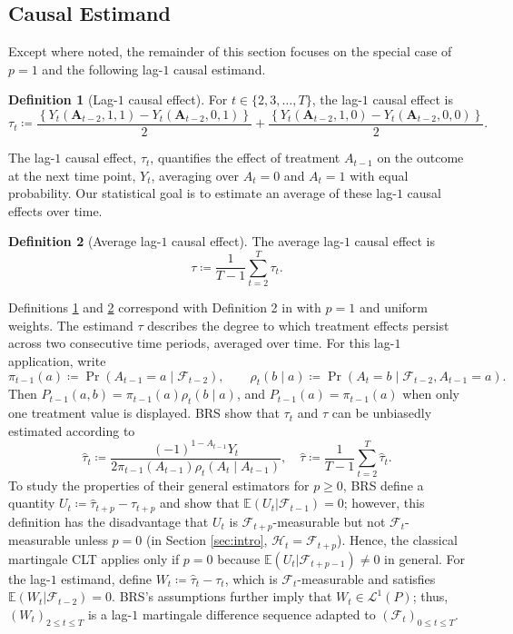 \documentclass[11pt]{article}
\renewcommand\vec[1]{\boldsymbol{#1}}
\newcommand{\E}{\mathbb{E}}
\newcommand{\Hcal}{\mathcal{H}}
\newcommand{\F}{\mathcal{F}}
\renewcommand{\L}{\mathcal{L}}
\theoremstyle{definition}
\newtheorem{definition}{Definition}
\begin{document}
\subsection{Causal Estimand}\label{sec:application-estimand}

Except where noted, the remainder of this section focuses on the special case of $p = 1$ and the following lag-$1$ causal estimand.
\begin{definition}[Lag-$1$ causal effect]\label{def:lag1-causal-effect}
For $t \in \{2, 3, \ldots, T\}$, the lag-$1$ causal effect is
\[
\tau_t \coloneqq
    \frac{\left\{Y_t\left(\vec{A}_{t-2}, 1, 1\right) - Y_t\left(\vec{A}_{t-2}, 0, 1\right)\right\}}{2} +
    \frac{\left\{Y_t\left(\vec{A}_{t-2}, 1, 0\right) - Y_t\left(\vec{A}_{t-2}, 0, 0\right)\right\}}{2}.
\]
\end{definition}
The lag-$1$ causal effect, $\tau_t$, quantifies the effect of treatment $A_{t-1}$ on the outcome at the next time point, $Y_t$, averaging over $A_t = 0$ and $A_t = 1$ with equal probability.
Our statistical goal is to estimate an average of these lag-$1$ causal effects over time.
\begin{definition}[Average lag-$1$ causal effect]\label{def:avg-lag1-causal-effect}
The average lag-$1$ causal effect is
\[\tau \coloneqq \frac{1}{T-1} \sum_{t=2}^T \tau_t.\]
\end{definition}
Definitions \ref{def:lag1-causal-effect} and \ref{def:avg-lag1-causal-effect} correspond with Definition 2 in \citet{bojinov_time_2019} with $p=1$ and uniform weights.
The estimand $\tau$ describes the degree to which treatment effects persist across two consecutive time periods, averaged over time.
For this lag-$1$ application, write
\[
\pi_{t-1}(a)\coloneqq\Pr(A_{t-1}=a\mid\F_{t-2}),
\qquad
\rho_t(b\mid a)\coloneqq\Pr(A_t=b\mid\F_{t-2},A_{t-1}=a).
\]
Then \(P_{t-1}(a,b)=\pi_{t-1}(a)\rho_t(b\mid a)\), and \(P_{t-1}(a)=\pi_{t-1}(a)\) when only one treatment value is displayed.
BRS show that $\tau_t$ and $\tau$ can be unbiasedly estimated according to
\begin{equation}\label{eq:tau-hat}
    \hat{\tau}_t \coloneqq \frac{(-1)^{1-A_{t-1}} Y_t}{2\pi_{t-1}(A_{t-1})\rho_t(A_t\mid A_{t-1})},\quad
    \hat{\tau} \coloneqq \frac{1}{T-1} \sum_{t=2}^T \hat{\tau}_t.
\end{equation}
To study the properties of their general estimators for $p \geq 0$, BRS define a quantity $U_t \coloneqq \hat{\tau}_{t+p} - \tau_{t+p}$ and show that $\E(U_t | \F_{t-1}) = 0$;
however, this definition has the disadvantage that $U_t$ is $\F_{t+p}$-measurable but not $\F_{t}$-measurable unless $p=0$ (in Section \ref{sec:intro}, $\Hcal_t = \F_{t+p}$).
Hence, the classical martingale CLT applies only if $p=0$ because $\E(U_t | \F_{t+p-1}) \neq 0$ in general.
For the lag-$1$ estimand, define $W_t \coloneqq \hat{\tau}_t - \tau_t$, which is $\F_t$-measurable and satisfies $\E(W_t | \F_{t-2}) = 0$.
BRS's assumptions further imply that $W_t \in \L^1(P)$; thus, $(W_t)_{2 \leq t \leq T}$ is a lag-$1$ martingale difference sequence adapted to $(\F_t)_{0 \leq t \leq T}$.
\end{document}
